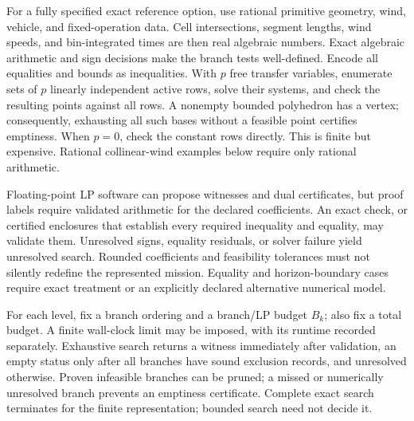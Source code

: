For a fully specified exact reference option, use rational primitive
geometry, wind, vehicle, and fixed-operation data. Cell intersections,
segment lengths, wind speeds, and bin-integrated times are then real
algebraic numbers. Exact algebraic arithmetic and sign decisions make the
branch tests well-defined. Encode all equalities and bounds as inequalities.
With $p$ free transfer variables, enumerate sets of $p$ linearly independent
active rows, solve their systems, and check the resulting points against
all rows. A nonempty bounded polyhedron has a vertex; consequently,
exhausting all such bases without a feasible point certifies emptiness.
When $p=0$, check the constant rows directly. This is finite but expensive.
Rational collinear-wind examples below require only rational arithmetic.

Floating-point LP software can propose witnesses and dual certificates,
but proof labels require validated arithmetic for the declared coefficients.
An exact check, or certified enclosures that establish every required
inequality and equality, may validate them. Unresolved signs, equality
residuals, or solver failure yield unresolved search. Rounded coefficients
and feasibility tolerances must not silently redefine the represented
mission. Equality and horizon-boundary cases require exact treatment or an
explicitly declared alternative numerical model.

For each level, fix a branch ordering and a branch/LP budget $B_k$;
also fix a total budget. A finite wall-clock limit may be imposed, with
its runtime recorded separately. Exhaustive search returns a witness
immediately after validation, an empty status only after all branches have
sound exclusion records, and unresolved otherwise. Proven infeasible
branches can be pruned; a missed or numerically unresolved branch prevents
an emptiness certificate. Complete exact search terminates for the finite
representation; bounded search need not decide it.

